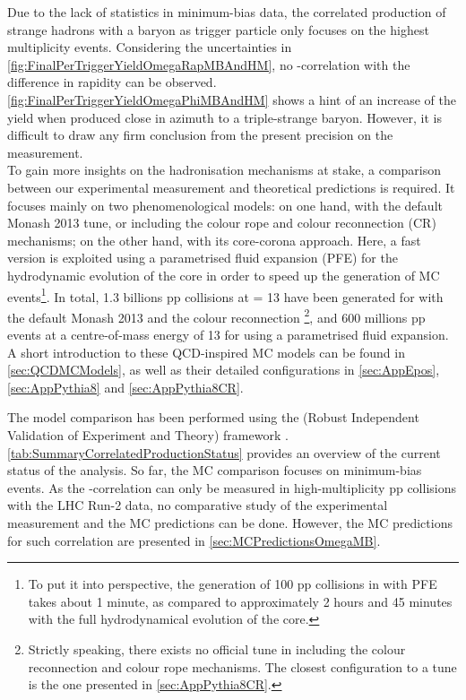 Due to the lack of statistics in minimum-bias data, the correlated production of strange hadrons with a \rmOmegaPM baryon as trigger particle only focuses on the highest multiplicity events. Considering the uncertainties in \fig\ref{fig:FinalPerTriggerYieldOmegaRapMBAndHM}, no \rmOmegaPM-\rmPhiMes correlation with the difference in rapidity can be observed. \Fig\ref{fig:FinalPerTriggerYieldOmegaPhiMBAndHM} shows a hint of an increase of the \rmPhiMes yield when produced close in azimuth to a triple-strange baryon. However, it is difficult to draw any firm conclusion from the present precision on the measurement.\\

To gain more insights on the hadronisation mechanisms at stake, a comparison between our experimental measurement and theoretical predictions is required. It focuses mainly on two phenomenological models: on one hand, \Pythiaeight with the default Monash 2013 tune, or including the colour rope and colour reconnection (CR) mechanisms; on the other hand, \EposFour with its core-corona approach. Here, a fast \EposFour version is exploited using a parametrised fluid expansion (PFE) for the hydrodynamic evolution of the core in order to speed up the generation of MC events\footnote{To put it into perspective, the generation of 100 pp collisions in \EposFour with PFE takes about 1 minute, as compared to approximately 2 hours and 45 minutes with the full hydrodynamical evolution of the core.}. In total, 1.3 billions pp collisions at \sqrtS = 13 \tev have been generated for \Pythiaeight with the default Monash 2013 and the colour reconnection \footnote{Strictly speaking, there exists no official tune in \Pythia including the colour reconnection and colour rope mechanisms. The closest configuration to a tune is the one presented in \appdx\ref{sec:AppPythia8CR}.}, and 600 millions pp events at a centre-of-mass energy of 13 \tev for \EposFour using a parametrised fluid expansion. A short introduction to these QCD-inspired MC models can be found in \appdx\ref{sec:QCDMCModels}, as well as their detailed configurations in \appdx\ref{sec:AppEpos}, \appdx\ref{sec:AppPythia8} and \appdx\ref{sec:AppPythia8CR}.

The model comparison has been performed using the \Rivet (Robust Independent Validation of Experiment and Theory) framework \cite{hepforgeRivetParticlephysicsMC2023}. \Tab\ref{tab:SummaryCorrelatedProductionStatus} provides an overview of the current status of the analysis. So far, the MC comparison focuses on minimum-bias events. As the \rmOmegaPM-\rmPhiMes correlation can only be measured in high-multiplicity pp collisions with the LHC Run-2 data, no comparative study of the experimental measurement and the MC predictions can be done. However, the MC predictions for such correlation are presented in \appdx\ref{sec:MCPredictionsOmegaMB}.


